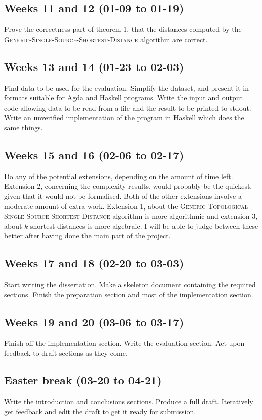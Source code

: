 \subsection*{Weeks 11 and 12 (01-09 to 01-19)}
Prove the correctness part of theorem 1, that the distances computed by the \textsc{Generic-Single-Source-Shortest-Distance} algorithm are correct.

\subsection*{Weeks 13 and 14 (01-23 to 02-03)}
Find data to be used for the evaluation.
Simplify the dataset, and present it in formats suitable for Agda and Haskell programs.
Write the input and output code allowing data to be read from a file and the result to be printed to stdout.
Write an unverified implementation of the program in Haskell which does the same things.

\subsection*{Weeks 15 and 16 (02-06 to 02-17)}
Do any of the potential extensions, depending on the amount of time left.
Extension 2, concerning the complexity results, would probably be the quickest, given that it would not be formalised.
Both of the other extensions involve a moderate amount of extra work.
Extension 1, about the \textsc{Generic-Topological-Single-Source-Shortest-Distance} algorithm is more algorithmic and extension 3, about $k$-shortest-distances is more algebraic.
I will be able to judge between these better after having done the main part of the project.

\subsection*{Weeks 17 and 18 (02-20 to 03-03)}
Start writing the dissertation.
Make a skeleton document containing the required sections.
Finish the preparation section and most of the implementation section.

\subsection*{Weeks 19 and 20 (03-06 to 03-17)}
Finish off the implementation section.
Write the evaluation section.
Act upon feedback to draft sections as they come.

\subsection*{Easter break (03-20 to 04-21)}
Write the introduction and conclusions sections.
Produce a full draft.
Iteratively get feedback and edit the draft to get it ready for submission.
